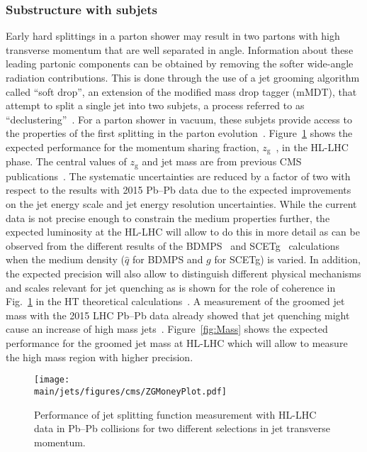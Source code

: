 \subsubsection{Substructure with subjets}
Early hard splittings in a parton shower may result in two partons with high transverse momentum that are well separated in angle. 
Information about these leading partonic components can be obtained by removing the softer wide-angle radiation contributions. This is done through the use of a jet grooming algorithm called ``soft drop'', an extension of the modified mass drop tagger (mMDT), that attempt to split a single jet into two subjets, a process referred to as ``declustering''~\cite{Ellis:2009me,Butterworth:2008iy,Krohn:2009th,Dasgupta:2013ihk,Larkoski:2014wba}. For a parton shower in vacuum, these subjets provide access to the properties of the first splitting in the parton evolution~\cite{Altarelli:1977zs,Larkoski:2015lea}. Figure~\ref{fig:ZG} shows the expected performance for the momentum sharing fraction, $z_{\mathrm{g}}$~\cite{Larkoski:2015lea}, in the HL-LHC phase. The central values of $z_{\mathrm{g}}$ and jet mass are from previous CMS publications~\cite{Sirunyan:2017bsd,Sirunyan:2018gct}. The systematic uncertainties are reduced by a factor of two with respect to the results with 2015 Pb--Pb data due to the expected improvements on the jet energy scale and jet energy resolution uncertainties.  
While the current data is not precise enough to constrain the medium properties further, the expected luminosity at the HL-LHC will allow to do this in more detail as can be observed from the different results of the BDMPS~\cite{Mehtar-Tani:2016aco} and SCETg~\cite{Chien:2016led} calculations when the medium density ($\hat{q}$ for BDMPS and $g$ for SCETg) is varied. In addition, the expected precision will also allow to distinguish different physical mechanisms and scales relevant for jet quenching as is shown for the role of coherence in Fig.~\ref{fig:ZG} in the HT theoretical calculations~\cite{Chang:2017gkt}. A measurement of the groomed jet mass with the 2015 LHC Pb--Pb data already showed that jet quenching might cause an increase of high mass jets~\cite{Sirunyan:2018gct}. Figure~\ref{fig:Mass} shows the expected performance for the groomed jet mass at HL-LHC which will allow to measure the high mass region with higher precision.
\begin{figure}[!ht]
\begin{center}
\texttt{[image: \\main/jets/figures/cms/ZGMoneyPlot.pdf]}
\caption{Performance of jet splitting function measurement with HL-LHC data in Pb--Pb collisions for two different selections in jet transverse momentum.~\cite{CMS-FTR-17-002:2017dec}}
\label{fig:ZG}
\end{center}
\end{figure}
